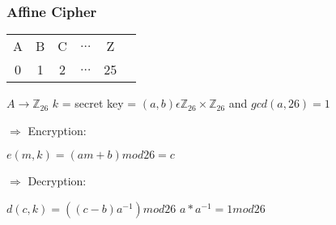 \documentclass[11pt]{article}
\begin{document}
	\subsubsection{Affine Cipher}
	\begin{tabular}{ |c|c|c|c|c|c| }
		\hline
		A & B & C & $\dots$ & Z \\ 
		0 & 1 & 2 & $\dots$ & 25  \\
		\hline
	\end{tabular} \newline \break
	$A \rightarrow \mathbb{Z}_{26}$ \newline
	$k$ = secret key = $(a,b) \epsilon \mathbb{Z}_{26} \times \mathbb{Z}_{26}$ and $gcd(a, 26) = 1$ \newline
	\begin{medium}
		$\Rightarrow$ Encryption:
	\end{medium}
	\newline
	$e(m,k) = (am + b)mod 26 = c$
	\newline \break
	\begin{Large}
		$\Rightarrow$ Decryption:
	\end{Large}
	\newline
	$d(c,k) = ((c - b)a^{-1})mod 26$ \newline
	$a*a^{-1} = 1 mod 26$ 
	
\end{document}
